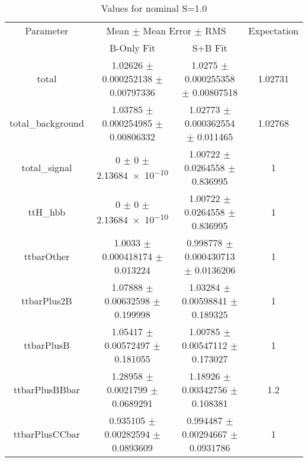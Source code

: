 \begin{table}
\centering
\caption{Values for nominal S=1.0}
\begin{tabular}{cccc}
\toprule
Parameter & \multicolumn{2}{c}{Mean $\pm$ Mean Error $\pm$ RMS} & Expectation\\
 & B-Only Fit & S+B Fit & \\
\midrule
total & \num{1.02626} $\pm$ \num{0.000252138} $\pm$ \num{0.00797336} & \num{1.0275} $\pm$ \num{0.000255358} $\pm$ \num{0.00807518} & \num{1.02731}\\
total\_background & \num{1.03785} $\pm$ \num{0.000254985} $\pm$ \num{0.00806332} & \num{1.02773} $\pm$ \num{0.000362554} $\pm$ \num{0.011465} & \num{1.02768}\\
total\_signal & \num{0} $\pm$ \num{0} $\pm$ \num{2.13684e-10} & \num{1.00722} $\pm$ \num{0.0264558} $\pm$ \num{0.836995} & \num{1}\\
ttH\_hbb & \num{0} $\pm$ \num{0} $\pm$ \num{2.13684e-10} & \num{1.00722} $\pm$ \num{0.0264558} $\pm$ \num{0.836995} & \num{1}\\
ttbarOther & \num{1.0033} $\pm$ \num{0.000418174} $\pm$ \num{0.013224} & \num{0.998778} $\pm$ \num{0.000430713} $\pm$ \num{0.0136206} & \num{1}\\
ttbarPlus2B & \num{1.07888} $\pm$ \num{0.00632598} $\pm$ \num{0.199998} & \num{1.03284} $\pm$ \num{0.00598841} $\pm$ \num{0.189325} & \num{1}\\
ttbarPlusB & \num{1.05417} $\pm$ \num{0.00572497} $\pm$ \num{0.181055} & \num{1.00785} $\pm$ \num{0.00547112} $\pm$ \num{0.173027} & \num{1}\\
ttbarPlusBBbar & \num{1.28958} $\pm$ \num{0.0021799} $\pm$ \num{0.0689291} & \num{1.18926} $\pm$ \num{0.00342756} $\pm$ \num{0.108381} & \num{1.2}\\
ttbarPlusCCbar & \num{0.935105} $\pm$ \num{0.00282594} $\pm$ \num{0.0893609} & \num{0.994487} $\pm$ \num{0.00294667} $\pm$ \num{0.0931786} & \num{1}\\
\bottomrule
\end{tabular}
\end{table}